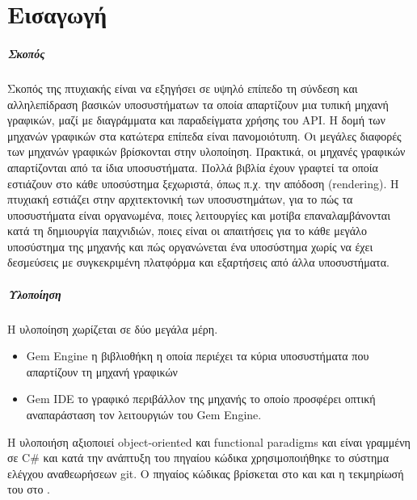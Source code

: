 \chapter{Εισαγωγή}
	\paragraph{Σκοπός}
	Σκοπός της πτυχιακής είναι να εξηγήσει σε υψηλό επίπεδο τη σύνδεση και αλληλεπίδραση βασικών υποσυστήματων τα οποία απαρτίζουν μια
	τυπική μηχανή γραφικών, μαζί με διαγράμματα και παραδείγματα χρήσης του \gls{API}. 
	Η δομή των μηχανών γραφικών στα κατώτερα επίπεδα είναι πανομοιότυπη. Οι μεγάλες διαφορές των μηχανών γραφικών βρίσκονται στην υλοποίηση. Πρακτικά, οι μηχανές γραφικών απαρτίζονται από τα ίδια υποσυστήματα. Πολλά βιβλία έχουν γραφτεί τα οποία εστιάζουν στο κάθε υποσύστημα ξεχωριστά, όπως π.χ. την απόδοση (rendering).
	Η πτυχιακή εστιάζει στην αρχιτεκτονική των υποσυστημάτων, για το πώς τα υποσυστήματα είναι οργανωμένα, ποιες λειτουργίες και μοτίβα επαναλαμβάνονται κατά τη δημιουργία παιχνιδιών, ποιες είναι οι απαιτήσεις για το κάθε μεγάλο υποσύστημα της μηχανής και πώς οργανώνεται ένα υποσύστημα χωρίς να έχει δεσμεύσεις με συγκεκριμένη πλατφόρμα και εξαρτήσεις από άλλα υποσυστήματα.

	\paragraph{Υλοποίηση}
	Η υλοποίηση χωρίζεται σε δύο μεγάλα μέρη.	
	\begin{itemize}
		\item {Gem Engine} η βιβλιοθήκη η οποία περιέχει τα κύρια υποσυστήματα που απαρτίζουν τη μηχανή γραφικών 
		\item {Gem IDE} το γραφικό περιβάλλον της μηχανής το οποίο προσφέρει οπτική αναπαράσταση τον λειτουργιών του Gem Engine.
	\end{itemize}
	H υλοποιήση αξιοποιεί object-oriented και functional paradigms και είναι γραμμένη σε C\# και κατά την ανάπτυξη του πηγαίου κώδικα χρησιμοποιήθηκε το σύστημα ελέγχου αναθεωρήσεων git.  Ο πηγαίος κώδικας βρίσκεται στο \cite{gem} και \cite{ginet} και η τεκμηρίωσή του στο \cite{gemDocs}.	
	
